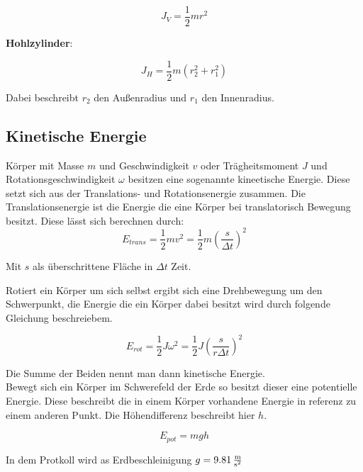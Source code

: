 \begin{equation}
    J_V = \frac{1}{2} mr^2
    \label{eq:JVoll}
\end{equation}

\textbf{Hohlzylinder}:

\begin{equation}
    J_H = \frac{1}{2}m (r_2^2 + r_1^2)
    \label{eq:JHohl}
\end{equation}

Dabei beschreibt $r_2$ den Außenradius und $r_1$ den Innenradius.

\subsection{Kinetische Energie}

Körper mit Masse $m$ und Geschwindigkeit $v$ oder Trägheitsmoment $J$ und Rotationsgeschwindigkeit $\omega$ besitzen eine sogenannte kineetische Energie.
Diese setzt sich aus der Translations- und Rotationsenergie zusammen.
Die Translationsenergie ist die Energie die eine Körper bei translatorisch Bewegung besitzt. Diese lässt sich berechnen durch:
\begin{equation}
    E_{trans} = \frac{1}{2}m v^2 = \frac{1}{2}m\left(\frac{s}{\Delta t}\right)^2
    \label{eq:ETrans}
\end{equation}

Mit $s$ als überschrittene Fläche in $\Delta t$ Zeit.

Rotiert ein Körper um sich selbst ergibt sich eine Drehbewegung um den Schwerpunkt, die Energie die ein Körper dabei besitzt wird durch folgende Gleichung beschreiebem.

\begin{equation}
    E_{rot} = \frac{1}{2}J \omega^2 = \frac{1}{2}J\left(\frac{s}{r \Delta t }\right)^2
    \label{eq:ERot}
\end{equation}

Die Summe der Beiden nennt man dann kinetische Energie.\\
Bewegt sich ein Körper im Schwerefeld der Erde so besitzt dieser eine potentielle Energie.
Diese beschreibt die in einem Körper vorhandene Energie in referenz zu einem anderen Punkt. Die Höhendifferenz beschreibt hier $h$.

\begin{equation}
    E_{pot} = mgh
    \label{eq:pot}
\end{equation}

In dem Protkoll wird as Erdbeschleinigung $g=\SI{9,81}{\frac{\meter}{\second^2}}$

